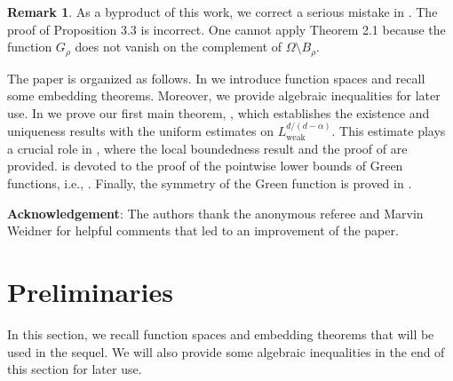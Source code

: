 \documentclass[reqno]{amsart}
\theoremstyle{plain}
\theoremstyle{definition}
\newtheorem{remark}[theorem]{Remark}
\numberwithin{equation}{section}
\begin{document}
\begin{remark}
As a byproduct of this work, we correct a serious mistake in \cite{KaSt02}. The proof of Proposition 3.3 is incorrect. One cannot apply Theorem 2.1 because the function $G_\rho$ does not vanish on the complement of $\Omega \setminus B_\rho$. 
\end{remark}


The paper is organized as follows. 
In  we introduce function spaces and recall some embedding theorems. Moreover, we provide algebraic inequalities for later use. In  we prove our first main theorem, , which establishes the existence and uniqueness results with the uniform estimates on $L_{\mathrm{weak}}^{d/(d-\alpha)}$. This estimate plays a crucial role in , where the local boundedness result and the proof of  are provided.  is devoted to the proof of the pointwise lower bounds of Green functions, i.e., . Finally, the symmetry of the Green function is proved in .


{\bf Acknowledgement}: The authors thank the anonymous referee and Marvin Weidner for helpful comments that led to an improvement of the paper.



\section{Preliminaries} \label{sec:prelims}


In this section, we recall function spaces and embedding theorems that will be used in the sequel. We will also provide some algebraic inequalities in the end of this section for later use.
\end{document}
